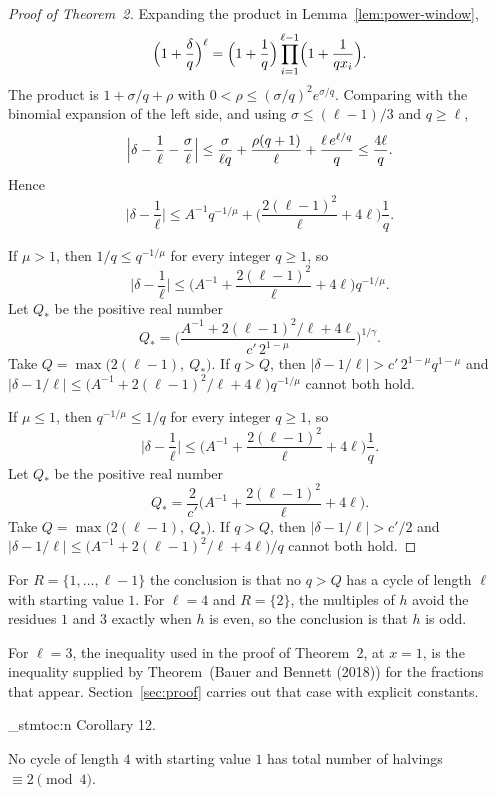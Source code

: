 \documentclass[11pt]{article}
\newenvironment{named}[1]{%
  \par\addvspace{\medskipamount}%
  \pagebreak[3]%
  \noindent{\bfseries #1}\space\ignorespaces
  \stmtoc{#1}%
}{\par\addvspace{\medskipamount}}
\newcommand{\stmtoc}[1]{ \qn_stmtoc:n {#1} }
\begin{document}
\begin{proof}[Proof of Theorem~2]
Expanding the product in Lemma~\ref{lem:power-window},
\[
\Bigl(1 + \frac{\delta}{q}\Bigr)^\ell
= \Bigl(1 + \frac1q\Bigr)\prod_{i=1}^{\ell-1}\Bigl(1 + \frac1{qx_i}\Bigr).
\]
The product is $1 + \sigma/q + \rho$ with $0 < \rho \le (\sigma/q)^2 e^{\sigma/q}$.
Comparing with the binomial expansion of the left side, and using $\sigma \le (\ell-1)/3$ and $q \ge \ell$,
\[
\Bigl|\delta - \frac1\ell - \frac{\sigma}{\ell}\Bigr|
\le \frac{\sigma}{\ell q} + \frac{\rho(q+1)}{\ell} + \frac{\ell\, e^{\ell/q}}{q}
\le \frac{4\ell}{q}.
\]
Hence
\[
\bigl|\delta - \frac1\ell\bigr|
\le A^{-1} q^{-1/\mu} + \Biggl(\frac{2(\ell-1)^2}{\ell} + 4\ell\Biggr)\frac1q.
\]

If $\mu > 1$, then $1/q \le q^{-1/\mu}$ for every integer $q \ge 1$, so
\[
\bigl|\delta - \frac1\ell\bigr|
\le \Biggl(A^{-1} + \frac{2(\ell-1)^2}{\ell} + 4\ell\Biggr) q^{-1/\mu}.
\]
Let $Q_*$ be the positive real number
\[
Q_* = \Biggl( \frac{A^{-1} + 2(\ell-1)^2/\ell + 4\ell}{c'\, 2^{1-\mu}} \Biggr)^{1/\gamma}.
\]
Take $Q = \max\bigl(2(\ell-1),\ Q_*\bigr)$.
If $q > Q$, then $\bigl|\delta - 1/\ell\bigr| > c'\, 2^{1-\mu} q^{1-\mu}$ and $\bigl|\delta - 1/\ell\bigr| \le \bigl(A^{-1} + 2(\ell-1)^2/\ell + 4\ell\bigr) q^{-1/\mu}$ cannot both hold.

If $\mu \le 1$, then $q^{-1/\mu} \le 1/q$ for every integer $q \ge 1$, so
\[
\bigl|\delta - \frac1\ell\bigr|
\le \Biggl(A^{-1} + \frac{2(\ell-1)^2}{\ell} + 4\ell\Biggr)\frac1q.
\]
Let $Q_*$ be the positive real number
\[
Q_* = \frac{2}{c'}\Biggl(A^{-1} + \frac{2(\ell-1)^2}{\ell} + 4\ell\Biggr).
\]
Take $Q = \max\bigl(2(\ell-1),\ Q_*\bigr)$.
If $q > Q$, then $\bigl|\delta - 1/\ell\bigr| > c'/2$ and $\bigl|\delta - 1/\ell\bigr| \le \bigl(A^{-1} + 2(\ell-1)^2/\ell + 4\ell\bigr)/q$ cannot both hold.
\end{proof}

For $R = \{1, \ldots, \ell-1\}$ the conclusion is that no $q > Q$ has a cycle of length $\ell$ with starting value $1$.
For $\ell = 4$ and $R = \{2\}$, the multiples of $h$ avoid the residues $1$ and $3$ exactly when $h$ is even, so the conclusion is that $h$ is odd.

For $\ell = 3$, the inequality used in the proof of Theorem~2, at $x = 1$, is the inequality supplied by Theorem~(Bauer and Bennett (2018)) for the fractions that appear. Section~\ref{sec:proof} carries out that case with explicit constants.

\begin{named}{Corollary 12.}
No cycle of length $4$ with starting value $1$ has total number of halvings $\equiv 2 \pmod{4}$.
\end{named}
\end{document}

